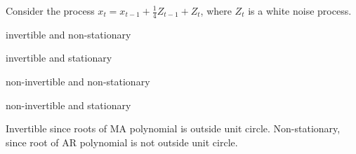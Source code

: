 
\begin{question}
Consider the process \(x_t = x_{t−1} + \frac{1}{4} Z_{t−1} + Z_{t}\), where \(Z_t\) is a white noise process.
\begin{answerlist}
  \item invertible and non-stationary
  \item invertible and stationary
  \item non-invertible and non-stationary
  \item non-invertible and stationary
\end{answerlist}
\end{question}

\begin{solution}
Invertible since roots of MA polynomial is outside unit circle.
Non-stationary, since root of AR polynomial is not outside unit circle.
\end{solution}

